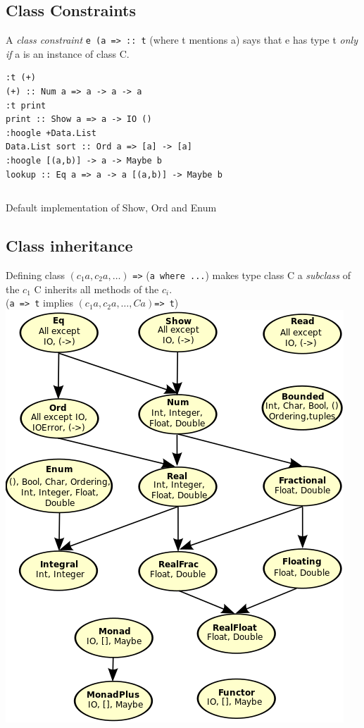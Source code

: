 \documentclass{article}
\newcommand{\Haskell}[1]{\texttt{#1}}
\begin{document}
\subsection{Class Constraints}
A \emph{class constraint} \Haskell{e (a => :: t} (where t mentions a) says that e has type t \emph{only if} a is an instance of class C.\\
\begin{verbatim}
:t (+)
(+) :: Num a => a -> a -> a
:t print
print :: Show a => a -> IO ()
:hoogle +Data.List
Data.List sort :: Ord a => [a] -> [a]
:hoogle [(a,b)] -> a -> Maybe b
lookup :: Eq a => a -> a [(a,b)] -> Maybe b
\end{verbatim}
\begin{listing}[h!]
\inputminted{Haskell}{type-classes.hs}
\caption{Default implementation of Show, Ord and Enum}
\end{listing}
\subsection{Class inheritance}
Defining class $(c_1a,c_2a,\ldots)$ \Haskell{=>} (\Haskell{a where ...}) makes type class C a \emph{subclass} of the $c_1$ C inherits all methods of the $c_i$.\\
(\Haskell{a => t} implies $(c_1a,c_2a,\ldots,Ca)$\Haskell{=> t})
\clearpage
\includegraphics[scale=0.7]{classes.png}
\newpage
\end{document}
